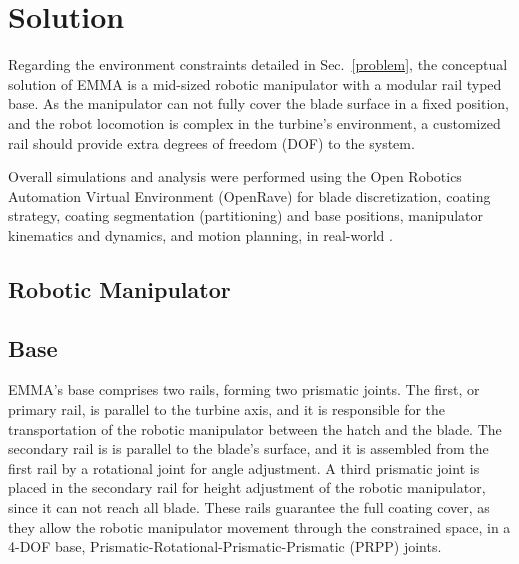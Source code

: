 \section{Solution}


Regarding the environment constraints detailed in Sec.~\ref{problem}, the
conceptual solution of EMMA is a mid-sized robotic manipulator with a modular
rail typed base. As the manipulator can not fully cover the blade surface in a
fixed position, and the robot locomotion is complex in the turbine's
environment, a customized rail should provide extra degrees of freedom (DOF) to
the system.

Overall simulations and analysis were performed using the Open Robotics
Automation Virtual Environment (OpenRave) for blade discretization, coating
strategy, coating segmentation (partitioning) and base positions, manipulator
kinematics and dynamics, and motion planning, in real-world
\cite{diankov2008openrave}. 



\subsection{Robotic Manipulator}

\subsection{Base}

EMMA's base comprises two rails, forming two prismatic joints. The
first, or primary rail, is parallel to the turbine axis, and it is responsible
for the transportation of the robotic manipulator between the hatch and the
blade. The secondary rail is is parallel to the blade's surface, and it is
assembled from the first rail by a rotational joint for angle adjustment. A
third prismatic joint is placed in the secondary rail for height adjustment of
the robotic manipulator, since it can not reach all blade. These rails guarantee
the full coating cover, as they allow the robotic manipulator movement through
the constrained space, in a 4-DOF base, Prismatic-Rotational-Prismatic-Prismatic
(PRPP) joints.

